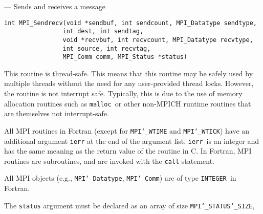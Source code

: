 \startmanpage
{}
--- Sends and receives a message 
\startvb\begin{verbatim}
int MPI_Sendrecv(void *sendbuf, int sendcount, MPI_Datatype sendtype, 
                int dest, int sendtag,
                void *recvbuf, int recvcount, MPI_Datatype recvtype, 
                int source, int recvtag,
                MPI_Comm comm, MPI_Status *status)

\end{verbatim}
\endvb

\par
{}
\par
{}
\par
This routine is thread-safe.  This means that this routine may be
safely used by multiple threads without the need for any user-provided
thread locks.  However, the routine is not interrupt safe.  Typically,
this is due to the use of memory allocation routines such as {\tt malloc
}or other non-MPICH runtime routines that are themselves not interrupt-safe.
\par
{}
All MPI routines in Fortran (except for {\tt MPI{\tt \char`\_}WTIME} and {\tt MPI{\tt \char`\_}WTICK}) have
an additional argument {\tt ierr} at the end of the argument list.  {\tt ierr
}is an integer and has the same meaning as the return value of the routine
in C.  In Fortran, MPI routines are subroutines, and are invoked with the
{\tt call} statement.
\par
All MPI objects (e.g., {\tt MPI{\tt \char`\_}Datatype}, {\tt MPI{\tt \char`\_}Comm}) are of type {\tt INTEGER
}in Fortran.
\par
The {\tt status} argument must be declared as an array of size {\tt MPI{\tt \char`\_}STATUS{\tt \char`\_}SIZE},
